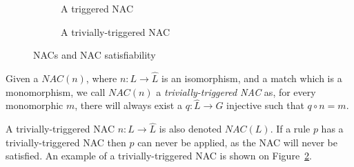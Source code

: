 \begin{example}
\begin{figure}[!ht]
\begin{subfigure}[t]{.5\textwidth}
    \caption{A triggered NAC}\label{fig:gts:nacs:triggered}
  \end{subfigure}
  \begin{subfigure}[t]{.5\textwidth}
    \centerline{}
    \caption{A trivially-triggered NAC}\label{fig:gts:nacs:trivial}
  \end{subfigure}
  \caption{NACs and NAC satisfiability}\label{fig:gts:nacs}
\end{figure}
\end{example}


\begin{definition} Given a $NAC(n)$, where $n : L \rightarrow \hat{L}$ is an isomorphism, and a match \match{} which is a monomorphism, we call $NAC(n)$ a \emph{trivially-triggered NAC} as, for every monomorphic $m$, there will always exist a $q : \hat{L} \rightarrow G$ injective such that $q \circ n = m$.

  A trivially-triggered NAC $n : L \rightarrow \hat{L}$ is also denoted $NAC(L)$. If a rule $p$ has a trivially-triggered NAC then $p$ can never be applied, as the NAC will never be satisfied. An example of a trivially-triggered NAC is shown on Figure~\ref{fig:gts:nacs:trivial}.
\end{definition}

